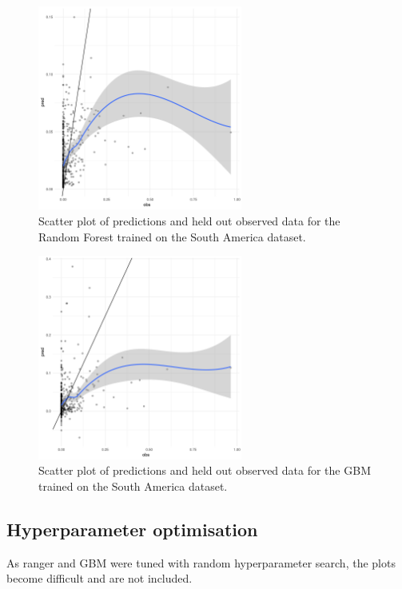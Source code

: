 \documentclass[review]{elsarticle}
\begin{document}
\begin{figure}[h!]
  \centering
  \includegraphics[width=0.6\textwidth]{figs/SI/ranger_obspred_sa.png}
\caption{
  Scatter plot of predictions and held out observed data for the Random Forest trained on the South America dataset.
}

\end{figure}


\begin{figure}[h!]
  \centering
  \includegraphics[width=0.6\textwidth]{figs/SI/gbm_obspred_sa.png}
\caption{
  Scatter plot of predictions and held out observed data for the GBM trained on the South America dataset.
}

\end{figure}


\clearpage
\subsection{Hyperparameter optimisation}

As ranger and GBM were tuned with random hyperparameter search, the plots become difficult and are not included.
\end{document}
